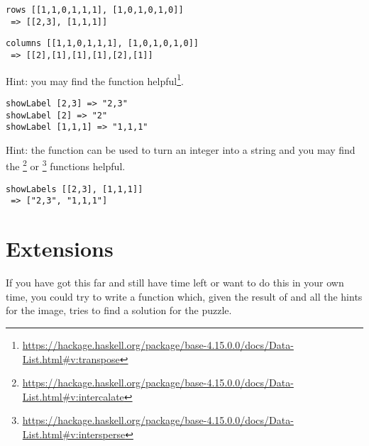 \begin{verbatim}
rows [[1,1,0,1,1,1], [1,0,1,0,1,0]]
 => [[2,3], [1,1,1]]
\end{verbatim}

\begin{verbatim}
columns [[1,1,0,1,1,1], [1,0,1,0,1,0]]
 => [[2],[1],[1],[1],[2],[1]]
\end{verbatim}
Hint: you may find the  function helpful\footnote{\url{https://hackage.haskell.org/package/base-4.15.0.0/docs/Data-List.html\#v:transpose}}.

\taskLine

\begin{verbatim}
showLabel [2,3] => "2,3"
showLabel [2] => "2"
showLabel [1,1,1] => "1,1,1"
\end{verbatim}
Hint: the  function can be used to turn an integer into a string and you may find the \footnote{\url{https://hackage.haskell.org/package/base-4.15.0.0/docs/Data-List.html\#v:intercalate}} or \footnote{\url{https://hackage.haskell.org/package/base-4.15.0.0/docs/Data-List.html\#v:intersperse}} functions helpful.

\begin{verbatim}
showLabels [[2,3], [1,1,1]]
 => ["2,3", "1,1,1"]
\end{verbatim}

\taskLine

\section*{Extensions}

If you have got this far and still have time left or want to do this in your own time, you could try to write a function which, given the result of  and all the hints for the image, tries to find a solution for the puzzle.
